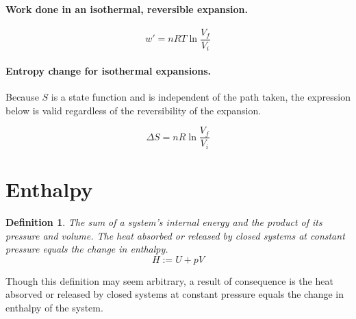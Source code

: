\documentclass{article}
\numberwithin{theorem}{section}
\numberwithin{corollary}{section}
\numberwithin{postulate}{section}
\numberwithin{lemma}{section}
\newtheorem{definition}{Definition}
\numberwithin{definition}{section}
\begin{document}
\paragraph{Work done in an isothermal, reversible expansion. }

\begin{equation}
  w' = nRT\ln{\frac{V_f}{V_i}}
\end{equation}

\paragraph{Entropy change for isothermal expansions. }Because $S$ is a state
function and is independent of the path taken, the expression below is valid
regardless of the reversibility of the expansion.

\begin{equation}
  \Delta S = nR \ln{\frac{V_f}{V_i}}
\end{equation}

\section{Enthalpy}

\begin{definition}
  The sum of a system's internal energy and the product of its pressure and
  volume. The heat absorbed or released by closed systems at constant pressure
  equals the change in enthalpy.
  \begin{equation}
   H := U + pV
  \end{equation}
\end{definition}

Though this definition may seem arbitrary, a result of consequence is the heat
absorved or released by closed systems at constant pressure equals the change in
enthalpy of the system.
\end{document}
